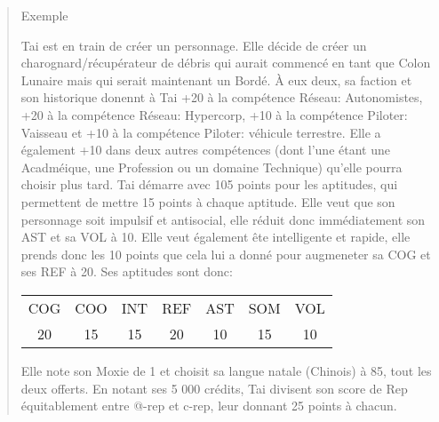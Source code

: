 \begin{quotation} Exemple 

Tai est en train de créer un personnage. Elle décide de créer un charognard/récupérateur de débris qui aurait commencé en tant que Colon Lunaire mais qui serait maintenant un Bordé. À eux deux, sa faction et son historique donennt à Tai +20 à la compétence Réseau: Autonomistes, +20 à la compétence Réseau: Hypercorp, +10 à la compétence Piloter: Vaisseau et +10 à la compétence Piloter: véhicule terrestre. Elle a également +10 dans deux autres compétences (dont l'une étant une Acadméique, une Profession ou un domaine Technique) qu'elle pourra choisir plus tard. Tai démarre avec 105 points pour les aptitudes, qui permettent de mettre 15 points à chaque aptitude. Elle veut que son personnage soit impulsif et antisocial, elle réduit donc immédiatement son AST et sa VOL à 10. Elle veut également ête intelligente et rapide, elle prends donc les 10 points que cela lui a donné pour augmeneter sa COG et ses REF à 20. Ses aptitudes sont donc: 

\begin{center} \begin{tabular}{ccccccc} COG &COO &INT &REF &AST &SOM &VOL \\ 

20 &15 &15 &20 &10 &15 &10 \\ 

\end{tabular} \end{center} 

Elle note son Moxie de 1 et choisit sa langue natale (Chinois) à 85, tout les deux offerts. En notant ses 5 000 crédits, Tai divisent son score de Rep équitablement entre @-rep et c-rep, leur donnant 25 points à chacun. 


\end{quotation}
